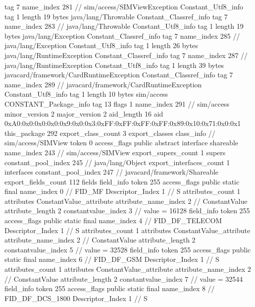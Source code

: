 {{{			tag	7
			name_index	281		// sim/access/SIMViewException
		}
		Constant_Utf8_info {
			tag	1
			length	19
			bytes	java/lang/Throwable
		}
		Constant_Classref_info {
			tag	7
			name_index	283		// java/lang/Throwable
		}
		Constant_Utf8_info {
			tag	1
			length	19
			bytes	java/lang/Exception
		}
		Constant_Classref_info {
			tag	7
			name_index	285		// java/lang/Exception
		}
		Constant_Utf8_info {
			tag	1
			length	26
			bytes	java/lang/RuntimeException
		}
		Constant_Classref_info {
			tag	7
			name_index	287		// java/lang/RuntimeException
		}
		Constant_Utf8_info {
			tag	1
			length	39
			bytes	javacard/framework/CardRuntimeException
		}
		Constant_Classref_info {
			tag	7
			name_index	289		// javacard/framework/CardRuntimeException
		}
		Constant_Utf8_info {
			tag	1
			length	10
			bytes	sim/access
		}
		CONSTANT_Package_info {
			tag	13
			flags	1
			name_index	291		// sim/access
			minor_version	2
			major_version	2
			aid_length	16
			aid	0xA0:0x0:0x0:0x0:0x9:0x0:0x3:0xFF:0xFF:0xFF:0xFF:0x89:0x10:0x71:0x0:0x1
		}
	}
	this_package	292
	export_class_count	3
	export_classes {
		class_info {		// sim/access/SIMView
			token	0
			access_flags	public abstract interface shareable
			name_index	243		// sim/access/SIMView
			export_supers_count	1
			supers {
				constant_pool_index	245		// java/lang/Object
			}
			export_interfaces_count	1
			interfaces {
				constant_pool_index	247		// javacard/framework/Shareable
			}
			export_fields_count	112
			fields {
			field_info {
				token	255
				access_flags	public static final
				name_index	0		// FID_MF
				Descriptor_Index	1		// S
				attributes_count	1
				attributes {
				ConstantValue_attribute {
					attribute_name_index	2		// ConstantValue
					attribute_length	2
					constantvalue_index	3		// value = 16128
				}
				}
			}
			field_info {
				token	255
				access_flags	public static final
				name_index	4		// FID_DF_TELECOM
				Descriptor_Index	1		// S
				attributes_count	1
				attributes {
				ConstantValue_attribute {
					attribute_name_index	2		// ConstantValue
					attribute_length	2
					constantvalue_index	5		// value = 32528
				}
				}
			}
			field_info {
				token	255
				access_flags	public static final
				name_index	6		// FID_DF_GSM
				Descriptor_Index	1		// S
				attributes_count	1
				attributes {
				ConstantValue_attribute {
					attribute_name_index	2		// ConstantValue
					attribute_length	2
					constantvalue_index	7		// value = 32544
				}
				}
			}
			field_info {
				token	255
				access_flags	public static final
				name_index	8		// FID_DF_DCS_1800
				Descriptor_Index	1		// S
}}}}}
